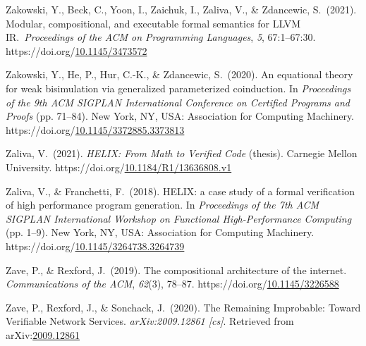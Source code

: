 \documentclass[12pt,twoside]{article}
\begin{document}
{\begin{thebibliography}{1079}
\mdbibitemlabel{}Zakowski, Y., Beck, C., Yoon, I., Zaichuk, I., Zaliva, V., \& Zdancewic, S.~(2021). Modular, compositional, and executable formal semantics for LLVM IR.~\emph{Proceedings of the ACM on Programming Languages}, \emph{5}, 67:1–67:30. https://doi.org/\href{https://dx.doi.org/10.1145/3473572}{10.1145/3473572}%

\mdbibitemlabel{}Zakowski, Y., He, P., Hur, C.-K., \& Zdancewic, S.~(2020). An equational theory for weak bisimulation via generalized parameterized coinduction. In \emph{Proceedings of the 9th ACM SIGPLAN International Conference on Certified Programs and Proofs} (pp. 71–84). New York, NY, USA: Association for Computing Machinery. https://doi.org/\href{https://dx.doi.org/10.1145/3372885.3373813}{10.1145/3372885.3373813}%

\mdbibitemlabel{}Zaliva, V.~(2021). \emph{HELIX: From Math to Verified Code} (thesis). Carnegie Mellon University. https://doi.org/\href{https://dx.doi.org/10.1184/R1/13636808.v1}{10.1184/R1/13636808.v1}%

\mdbibitemlabel{}Zaliva, V., \& Franchetti, F.~(2018). HELIX: a case study of a formal verification of high performance program generation. In \emph{Proceedings of the 7th ACM SIGPLAN International Workshop on Functional High-Performance Computing} (pp. 1–9). New York, NY, USA: Association for Computing Machinery. https://doi.org/\href{https://dx.doi.org/10.1145/3264738.3264739}{10.1145/3264738.3264739}%

\mdbibitemlabel{}Zave, P., \& Rexford, J.~(2019). The compositional architecture of the internet. \emph{Communications of the ACM}, \emph{62}(3), 78–87. https://doi.org/\href{https://dx.doi.org/10.1145/3226588}{10.1145/3226588}%

\mdbibitemlabel{}Zave, P., Rexford, J., \& Sonchack, J.~(2020). The Remaining Improbable: Toward Verifiable Network Services. \emph{arXiv:2009.12861 {}[cs]}. Retrieved from arXiv:\href{http://arxiv.org/abs/2009.12861}{2009.12861}%


\end{thebibliography}}
\end{document}
